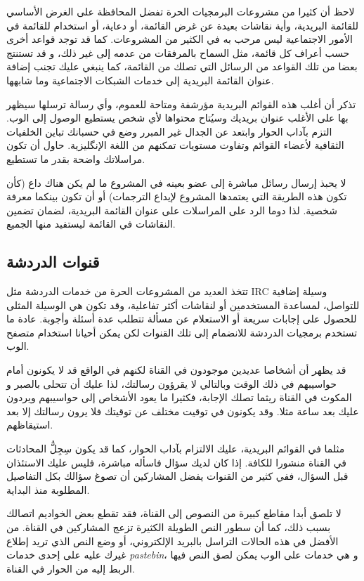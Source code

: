 لاحظ أن كثيرا من مشروعات البرمجيات الحرة تفضل المحافظة على الغرض الأساسي
للقائمة البريدية، وأية نقاشات بعيدة عن غرض القائمة، أو دعاية، أو
استخدام للقائمة في الأمور الاجتماعية ليس مرحب به في الكثير من
المشروعات. كما قد توجد قواعد أخرى حسب أعراف كل قائمة، مثل السماح
بالمرفقات من عدمه إلى غير ذلك، و قد تستنتج بعضا من تلك القواعد من
الرسائل التي تصلك من القائمة، كما ينبغي عليك تجنب إضافة عنوان القائمة
البريدية إلى خدمات الشبكات الاجتماعية وما شابهها.

تذكر أن أغلب هذه القوائم البريدية مؤرشفة ومتاحة للعموم، وأي رسالة ترسلها
سيظهر بها على اﻷغلب عنوان بريديك وسيُتاح محتواها لأي شخص يستطيع الوصول
إلى الوب. التزم بآداب الحوار وابتعد عن الجدال غير المبرر وضع في حسبانك
تباين الخلفيات الثقافية لأعضاء القوائم وتفاوت مستويات تمكنهم من اللغة
الإنگليزية. حاول أن تكون مراسلاتك واضحة بقدر ما تستطيع.

لا يحبذ إرسال رسائل مباشرة إلى عضو بعينه في المشروع ما لم يكن هناك داع
(كأن تكون هذه الطريقة التي يعتمدها المشروع لإيداع الترجمات) أو أن تكون
بينكما معرفة شخصية. لذا دوما الرد على المراسلات على عنوان القائمة
البريدية، لضمان تضمين النقاشات في القائمة ليستفيد منها الجميع.

\subsection{قنوات الدردشة}
تتخذ العديد من المشروعات الحرة من خدمات الدردشة مثل IRC وسيلة إضافية
للتواصل، لمساعدة المستخدمين أو لنقاشات أكثر تفاعلية، وقد تكون هي
الوسيلة المثلى للحصول على إجابات سريعة أو الاستعلام عن مسألة تتطلب عدة
أسئلة وأجوبة. عادة ما تستخدم برمجيات الدردشة للانضمام إلى تلك القنوات
لكن يمكن أحيانا استخدام متصفح الوب.

قد يظهر أن أشخاصا عديدين موجودون في القناة لكنهم في الواقع قد لا يكونون
أمام حواسيبهم في ذلك الوقت وبالتالي لا يقرؤون رسالتك، لذا عليك أن تتحلى
بالصبر و المكوث في القناة ريثما تصلك الإجابة، فكثيرا ما يعود الأشخاص
إلى حواسيبهم ويردون عليك بعد ساعة مثلا. وقد يكونون في توقيت مختلف عن
توقيتك فلا يرون رسالتك إلا بعد استيقاظهم.

مثلما في القوائم البريدية، عليك الالتزام بآداب الحوار، كما قد يكون
سِجِلُّ المحادثات في القناة منشورا للكافة. إذا كان لديك سؤال فاسأله
مباشرة، فليس عليك الاستئذان قبل السؤال، ففي كثير من القنوات يفضل
المشاركين أن تصوغ سؤالك بكل التفاصيل المطلوبة منذ البداية.

لا تلصق أبدا مقاطع كبيرة من النصوص إلى القناة، فقد تقطع بعض الخواديم
اتصالك بسبب ذلك، كما أن سطور النص الطويلة الكثيرة تزعج المشاركين في
القناة. من الأفضل في هذه الحالات التراسل بالبريد الإلكتروني، أو وضع
النص الذي تريد إطلاع غيرك عليه على إحدى خدمات {\it pastebin}، و هي
خدمات على الوب يمكن لصق النص فيها الربط إليه من الحوار في القناة.

